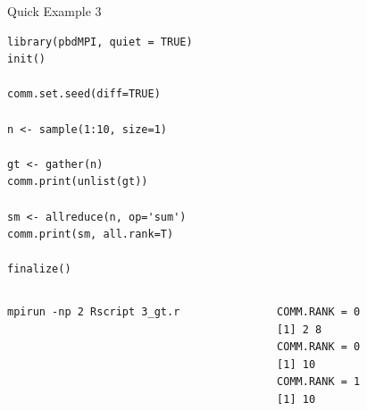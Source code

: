 \begin{frame}
  \begin{exampleblock}{Quick Example 3}
\begin{lstlisting}[title=Reduce and Gather: 3\_gt.r]
library(pbdMPI, quiet = TRUE)
init()

comm.set.seed(diff=TRUE)

n <- sample(1:10, size=1)

gt <- gather(n)
comm.print(unlist(gt))

sm <- allreduce(n, op='sum')
comm.print(sm, all.rank=T)

finalize()
\end{lstlisting}
  \begin{columns}[t,onlytextwidth]
    \begin{column}{0.58\textwidth}
\begin{lstlisting}[backgroundcolor=\color{white},keywordstyle=\color{black},title=Execute this script via:]
mpirun -np 2 Rscript 3_gt.r
\end{lstlisting}    
    \end{column}
    \hfill
    \begin{column}{0.4\textwidth}
\begin{lstlisting}[title=Sample Output:]
COMM.RANK = 0
[1] 2 8
COMM.RANK = 0
[1] 10
COMM.RANK = 1
[1] 10
\end{lstlisting}
    \end{column}
​  \end{columns}
  \end{exampleblock}
\end{frame}


